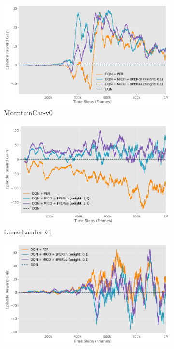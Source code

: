 \begin{figure}[h]
    \centering
    \begin{subfigure}{0.45\textwidth}
    \includegraphics[width=\linewidth]{Results/general_results/mountain_car_reward_gain_vs_dqn.png}
        \caption{MountainCar-v0}
        \label{fig:on_policy_weighting}
    \end{subfigure}
    \hfill
    \begin{subfigure}{0.45\textwidth}
        \includegraphics[width=\linewidth]{Results/general_results/lunarlander_reward_gain_vs_dqn.png}
        \caption{LunarLander-v1}
        \label{fig:uniform_weighting}
    \end{subfigure}
    \hfill
    \begin{subfigure}{0.45\textwidth}
        \includegraphics[width=\linewidth]{Results/general_results/cart_polev1_reward_gain_vs_dqn.png}

\end{subfigure}
\end{figure}
